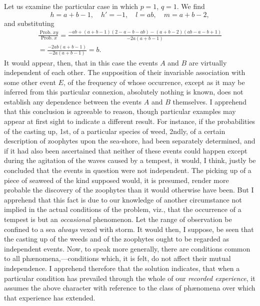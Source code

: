 \documentclass[oneside]{book}
\begin{document}
Let us examine the particular case in which $p = 1$, $q = 1$.
We find
\begin{equation*}
h = a + b - 1, \quad h' = -1, \quad l = ab, \quad m = a + b - 2,
\end{equation*}
and substituting
\begin{gather*}
\frac{\operatorname{Prob. } xy}{\operatorname{Prob. } x}
=\frac{-ab + (a+b-1)(2-a-b-ab)-(a+b-2)(ab-a-b+1)}{-2a(a+b-1)} \\
=\frac{-2ab(a+b-1)}{-2a(a+b-1)}=b.
\end{gather*}
It would appear, then, that in this case the events $A$ and $B$ are
virtually independent of each other. The supposition of their
invariable association with some other event $E$, of the frequency
of whose occurrence, except as it may be inferred from this
particular connexion, absolutely nothing is known, does not establish
any dependence between the events $A$ and $B$ themselves. I apprehend
that this conclusion is agreeable to reason, though particular
examples may appear at first sight to indicate a different
result. For instance, if the probabilities of the casting up, 1st,
of a particular species of weed, 2ndly, of a certain description of
zoophytes upon the sea-shore, had been separately determined,
and if it had also been ascertained that neither of these events
could happen except during the agitation of the waves caused by
a tempest, it would, I think, justly be concluded that the events
in question were not independent. The picking up of a piece of
seaweed of the kind supposed would, it is presumed, render more
probable the discovery of the zoophytes than it would otherwise
have been. But I apprehend that this fact is due to our
knowledge of another circumstance not implied in the actual conditions
of the problem, viz., that the occurrence of a tempest is but an
\textit{occasional} phenomenon. Let the range of observation be
confined to a sea \textit{always} vexed with storm. It would then, I
suppose, be seen that the casting up of the weeds and of the
zoophytes ought to be regarded as independent events. Now,
to speak more generally, there are conditions common to all
ph\ae{}nomena,---conditions which, it is felt, do not affect their mutual
independence. I apprehend therefore that the solution indicates,
that when a particular condition has prevailed through the whole
of our \textit{recorded experience}, it assumes the above character with
reference to the class of ph\ae{}nomena over which that experience
has extended.
\end{document}
